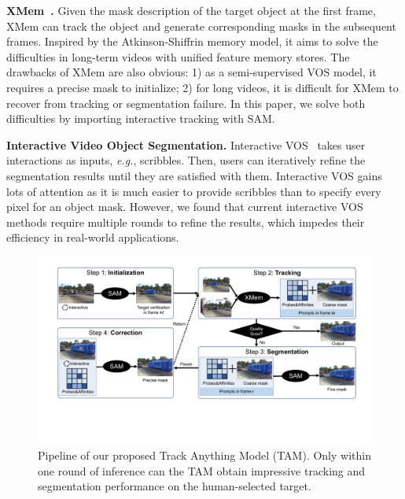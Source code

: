 \documentclass{article}
\begin{document}
\textbf{XMem~\cite{xmem}.}
Given the mask description of the target object at the first frame, XMem can track the object and generate corresponding masks in the subsequent frames.
Inspired by the Atkinson-Shiffrin memory model, it aims to solve the difficulties in long-term videos with unified feature memory stores.
The drawbacks of XMem are also obvious: 1) as a semi-supervised VOS model, it requires a precise mask to initialize; 2) for long videos, it is difficult for XMem to recover from tracking or segmentation failure.
In this paper, we solve both difficulties by importing interactive tracking with SAM.


\textbf{Interactive Video Object Segmentation.}
Interactive VOS~\cite{mivos} takes user interactions as inputs, \textit{e.g.}, scribbles.
Then, users can iteratively refine the segmentation results until they are satisfied with them.
Interactive VOS gains lots of attention as it is much easier to provide scribbles than to specify every pixel for an object mask.
However, we found that current interactive VOS methods require multiple rounds to refine the results, which impedes their efficiency in real-world applications.

\begin{figure}[t]
\centering
\includegraphics[width=\linewidth]{figs/overview_4.pdf}
\caption{Pipeline of our proposed Track Anything Model (TAM). Only within one round of inference can the TAM obtain impressive tracking and segmentation performance on the human-selected target.}
\label{fig:overview}
\end{figure}
\end{document}
